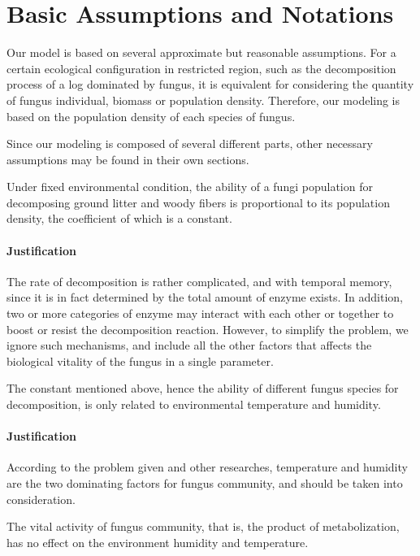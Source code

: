 \section{Basic Assumptions and Notations}\label{sec:assump}

Our model is based on several approximate but reasonable assumptions. For a certain ecological configuration in restricted region, such as the decomposition process of a log dominated by fungus, it is equivalent for considering the quantity of fungus individual, biomass or population density. Therefore, our modeling is based on the population density of each species of fungus.

Since our modeling is composed of several different parts, other necessary assumptions may be found in their own sections. 

\begin{definition}
Under fixed environmental condition, the ability of a fungi population for decomposing ground litter and woody fibers is proportional to its population density, the coefficient of which is a constant.
\end{definition}

\paragraph{Justification} The rate of decomposition is rather complicated, and with temporal memory, since it is in fact determined by the total amount of enzyme exists. In addition, two or more categories of enzyme may interact with each other or together to boost or resist the decomposition reaction. However, to simplify the problem, we ignore such mechanisms, and include all the other factors that affects the biological vitality of the fungus in a single parameter.

\begin{definition}
The constant mentioned above, hence the ability of different fungus species for decomposition, is only related to environmental temperature and humidity.
\end{definition}

\paragraph{Justification} According to the problem given and other researches, temperature and humidity are the two dominating factors for fungus community, and should be taken into consideration.

\begin{definition}
The vital activity of fungus community, that is, the product of metabolization, has no effect on the environment humidity and temperature.
\end{definition}

